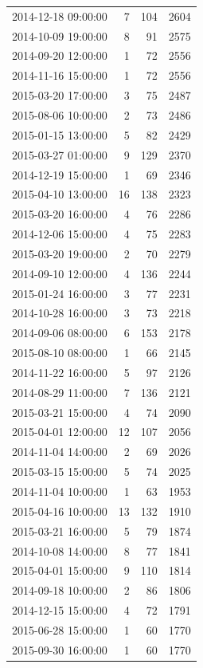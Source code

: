 \begin{tabular}{lrrr}
2014-12-18 09:00:00 & 7 & 104 & 2604 \\
2014-10-09 19:00:00 & 8 & 91 & 2575 \\
2014-09-20 12:00:00 & 1 & 72 & 2556 \\
2014-11-16 15:00:00 & 1 & 72 & 2556 \\
2015-03-20 17:00:00 & 3 & 75 & 2487 \\
2015-08-06 10:00:00 & 2 & 73 & 2486 \\
2015-01-15 13:00:00 & 5 & 82 & 2429 \\
2015-03-27 01:00:00 & 9 & 129 & 2370 \\
2014-12-19 15:00:00 & 1 & 69 & 2346 \\
2015-04-10 13:00:00 & 16 & 138 & 2323 \\
2015-03-20 16:00:00 & 4 & 76 & 2286 \\
2014-12-06 15:00:00 & 4 & 75 & 2283 \\
2015-03-20 19:00:00 & 2 & 70 & 2279 \\
2014-09-10 12:00:00 & 4 & 136 & 2244 \\
2015-01-24 16:00:00 & 3 & 77 & 2231 \\
2014-10-28 16:00:00 & 3 & 73 & 2218 \\
2014-09-06 08:00:00 & 6 & 153 & 2178 \\
2015-08-10 08:00:00 & 1 & 66 & 2145 \\
2014-11-22 16:00:00 & 5 & 97 & 2126 \\
2014-08-29 11:00:00 & 7 & 136 & 2121 \\
2015-03-21 15:00:00 & 4 & 74 & 2090 \\
2015-04-01 12:00:00 & 12 & 107 & 2056 \\
2014-11-04 14:00:00 & 2 & 69 & 2026 \\
2015-03-15 15:00:00 & 5 & 74 & 2025 \\
2014-11-04 10:00:00 & 1 & 63 & 1953 \\
2015-04-16 10:00:00 & 13 & 132 & 1910 \\
2015-03-21 16:00:00 & 5 & 79 & 1874 \\
2014-10-08 14:00:00 & 8 & 77 & 1841 \\
2015-04-01 15:00:00 & 9 & 110 & 1814 \\
2014-09-18 10:00:00 & 2 & 86 & 1806 \\
2014-12-15 15:00:00 & 4 & 72 & 1791 \\
2015-06-28 15:00:00 & 1 & 60 & 1770 \\
2015-09-30 16:00:00 & 1 & 60 & 1770 \\

\end{tabular}

